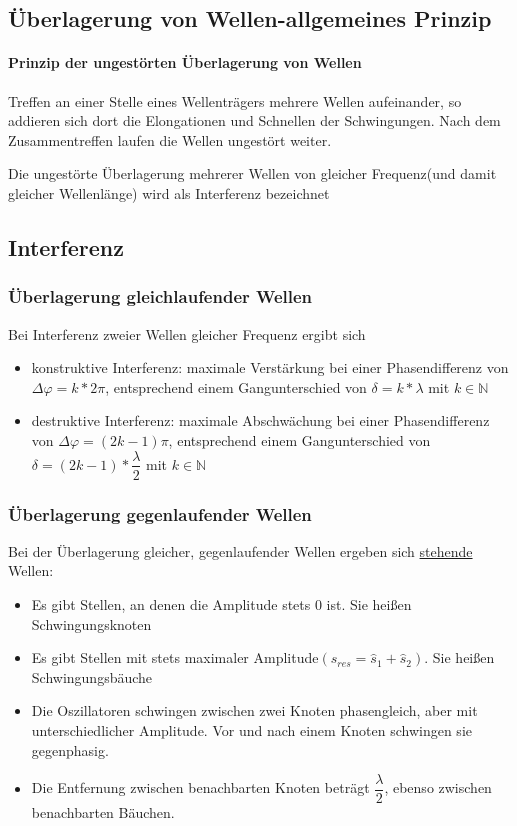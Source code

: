 \documentclass[12 pt]{article}
\numberwithin{equation}{section}
\begin{document}
	\subsection{Überlagerung von Wellen-allgemeines Prinzip}
	\paragraph{Prinzip der ungestörten Überlagerung von Wellen}
	Treffen an einer Stelle eines Wellenträgers mehrere Wellen aufeinander, so addieren sich dort die Elongationen und Schnellen der Schwingungen. Nach dem Zusammentreffen laufen die Wellen ungestört weiter.
	
	Die ungestörte Überlagerung mehrerer Wellen von gleicher Frequenz(und damit gleicher Wellenlänge) wird als Interferenz bezeichnet
	\subsection{Interferenz}
	\subsubsection{Überlagerung gleichlaufender Wellen}
	Bei Interferenz zweier Wellen gleicher Frequenz ergibt sich
	\begin{itemize}
		\item konstruktive Interferenz: maximale Verstärkung bei einer Phasendifferenz von $\Delta \varphi =k*2 \pi$, entsprechend einem Gangunterschied von $\delta=k*\lambda$ mit $k \in \mathbb{N}$
		\item destruktive Interferenz: maximale Abschwächung bei einer Phasendifferenz von $\Delta \varphi =(2k-1) \pi$, entsprechend einem Gangunterschied von $\delta=(2k-1)*\dfrac{\lambda}{2}$ mit $k \in \mathbb{N}$
	\end{itemize}
	\subsubsection{Überlagerung gegenlaufender Wellen}
	Bei der Überlagerung gleicher, gegenlaufender Wellen ergeben sich \underline{stehende} Wellen:
	\begin{itemize}
		\item Es gibt Stellen, an denen die Amplitude stets 0 ist. Sie heißen Schwingungsknoten
		\item Es gibt Stellen mit stets maximaler Amplitude$(\hat{s}_{res}=\hat{s}_1+\hat{s}_2)$. Sie heißen Schwingungsbäuche
		\item Die Oszillatoren schwingen zwischen zwei Knoten phasengleich, aber mit unterschiedlicher Amplitude. Vor und nach einem Knoten schwingen sie gegenphasig.
		\item Die Entfernung zwischen benachbarten Knoten beträgt $\dfrac{\lambda}{2}$, ebenso zwischen benachbarten Bäuchen.	
	\end{itemize}
	
\end{document}
